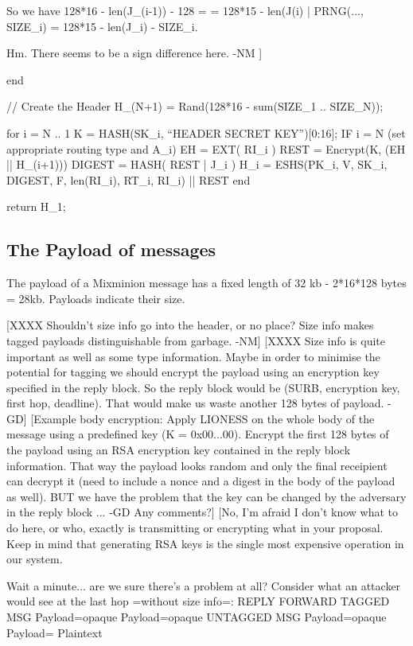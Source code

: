       So we have 128*16 - len(J_(i-1)) - 128 =
                = 128*15 - len(J(i) | PRNG(..., SIZE_i)
                = 128*15 - len(J_i) - SIZE_i.

      Hm.  There seems to be a sign difference here.
                                                     -NM ]


  end

  // Create the Header
  H_(N+1) = Rand(128*16 - sum(SIZE_1 .. SIZE_N));

  for i = N .. 1
	K = HASH(SK_i, ``HEADER SECRET KEY'')[0:16];
	IF i = N (set appropriate routing type and A_i)
	EH = EXT( RI_i )
        REST = Encrypt(K, (EH || H_(i+1)))
  	DIGEST = HASH( REST | J_i )
	H_i = ESHS(PK_i, V, SK_i, DIGEST, F, len(RI_i), RT_i, RI_i) || REST
  end

return H_1;

\subsection{The Payload of messages}

The payload of a Mixminion message has a fixed length of 32 kb
- 2*16*128 bytes = 28kb.   Payloads indicate their size.

  [XXXX Shouldn't size info go into the header, or no place?  Size
     info makes tagged payloads distinguishable from garbage. -NM]
  [XXXX Size info is quite important as well as some type information.
     Maybe in order to minimise the potential for tagging we should
     encrypt the payload using an encryption key specified in the
     reply block. So the reply block would be (SURB, encryption key,
     first hop, deadline). That would make us waste another 128 bytes
     of payload. -GD]
  [Example body encryption: Apply LIONESS on the whole body of the
     message using a predefined key (K = 0x00...00). Encrypt the first
     128 bytes of the payload using an RSA encryption key contained in
     the reply block information. That way the payload looks random
     and only the final receipient can decrypt it (need to include a
     nonce and a digest in the body of the payload as well). BUT we
     have the problem that the key can be changed by the adversary in
     the reply block ... -GD Any comments?]
  [No, I'm afraid I don't know what to do here, or who, exactly is
     transmitting or encrypting what in your proposal.  Keep in mind 
     that generating RSA keys is the single most expensive operation
     in our system.
 
     Wait a minute... are we sure there's a problem at all?  Consider
     what an attacker would see at the last hop =without size info=:
                            REPLY          FORWARD 
          TAGGED MSG     Payload=opaque  Payload=opaque 
          UNTAGGED MSG   Payload=opaque  Payload= Plaintext 

